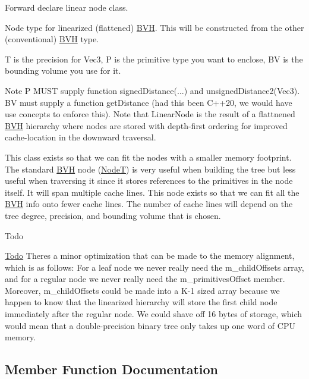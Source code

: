 Forward declare linear node class. 

Node type for linearized (flattened) \hyperlink{namespaceBVH}{B\+VH}. This will be constructed from the other (conventional) \hyperlink{namespaceBVH}{B\+VH} type.

T is the precision for Vec3, P is the primitive type you want to enclose, BV is the bounding volume you use for it.

\begin{DoxyNote}{Note}
P M\+U\+ST supply function signed\+Distance(...) and unsigned\+Distance2(\+Vec3). BV must supply a function get\+Distance (had this been C++20, we would have use concepts to enforce this). Note that Linear\+Node is the result of a flattnened \hyperlink{namespaceBVH}{B\+VH} hierarchy where nodes are stored with depth-\/first ordering for improved cache-\/location in the downward traversal.

This class exists so that we can fit the nodes with a smaller memory footprint. The standard \hyperlink{namespaceBVH}{B\+VH} node (\hyperlink{classBVH_1_1NodeT}{NodeT}) is very useful when building the tree but less useful when traversing it since it stores references to the primitives in the node itself. It will span multiple cache lines. This node exists so that we can fit all the \hyperlink{namespaceBVH}{B\+VH} info onto fewer cache lines. The number of cache lines will depend on the tree degree, precision, and bounding volume that is chosen.
\end{DoxyNote}
\begin{DoxyRefDesc}{Todo}
\item[\hyperlink{todo__todo000001}{Todo}]There\textquotesingle{}s a minor optimization that can be made to the memory alignment, which is as follows\+: For a leaf node we never really need the m\+\_\+child\+Offsets array, and for a regular node we never really need the m\+\_\+primitives\+Offset member. Moreover, m\+\_\+child\+Offsets could be made into a K-\/1 sized array because we happen to know that the linearized hierarchy will store the first child node immediately after the regular node. We could shave off 16 bytes of storage, which would mean that a double-\/precision binary tree only takes up one word of C\+PU memory. \end{DoxyRefDesc}


\subsection{Member Function Documentation}
\mbox{\label{classBVH_1_1LinearNodeT_af08feacbaa148425a896c196b0b6d1da}} 
